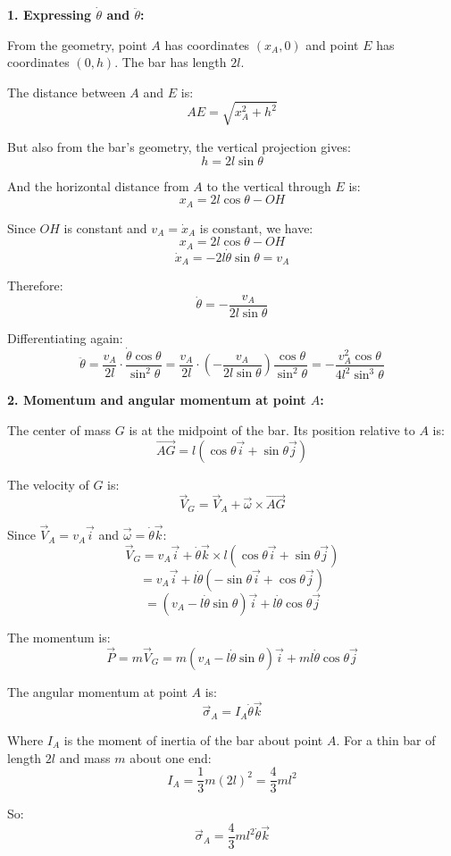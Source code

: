 \documentclass[12pt]{article}
\begin{document}
\begin{correctionbox}
\textbf{1. Expressing $\dot{\theta}$ and $\ddot{\theta}$:}

From the geometry, point $A$ has coordinates $(x_A, 0)$ and point $E$ has coordinates $(0, h)$. The bar has length $2l$.

The distance between $A$ and $E$ is:
$$AE = \sqrt{x_A^2 + h^2}$$

But also from the bar's geometry, the vertical projection gives:
$$h = 2l\sin\theta$$

And the horizontal distance from $A$ to the vertical through $E$ is:
$$x_A = 2l\cos\theta - OH$$

Since $OH$ is constant and $v_A = \dot{x}_A$ is constant, we have:
$$x_A = 2l\cos\theta - OH$$
$$\dot{x}_A = -2l\dot{\theta}\sin\theta = v_A$$

Therefore:
$$\dot{\theta} = -\frac{v_A}{2l\sin\theta}$$

Differentiating again:
$$\ddot{\theta} = \frac{v_A}{2l}\cdot\frac{\dot{\theta}\cos\theta}{\sin^2\theta} = \frac{v_A}{2l}\cdot\left(-\frac{v_A}{2l\sin\theta}\right)\frac{\cos\theta}{\sin^2\theta} = -\frac{v_A^2\cos\theta}{4l^2\sin^3\theta}$$

\textbf{2. Momentum and angular momentum at point $A$:}

The center of mass $G$ is at the midpoint of the bar. Its position relative to $A$ is:
$$\vec{AG} = l(\cos\theta\vec{i} + \sin\theta\vec{j})$$

The velocity of $G$ is:
$$\vec{V}_G = \vec{V}_A + \vec{\omega} \times \vec{AG}$$

Since $\vec{V}_A = v_A\vec{i}$ and $\vec{\omega} = \dot{\theta}\vec{k}$:
$$\vec{V}_G = v_A\vec{i} + \dot{\theta}\vec{k} \times l(\cos\theta\vec{i} + \sin\theta\vec{j})$$
$$= v_A\vec{i} + l\dot{\theta}(-\sin\theta\vec{i} + \cos\theta\vec{j})$$
$$= (v_A - l\dot{\theta}\sin\theta)\vec{i} + l\dot{\theta}\cos\theta\vec{j}$$

The momentum is:
$$\vec{P} = m\vec{V}_G = m(v_A - l\dot{\theta}\sin\theta)\vec{i} + ml\dot{\theta}\cos\theta\vec{j}$$

The angular momentum at point $A$ is:
$$\vec{\sigma}_A = I_A\dot{\theta}\vec{k}$$

Where $I_A$ is the moment of inertia of the bar about point $A$. For a thin bar of length $2l$ and mass $m$ about one end:
$$I_A = \frac{1}{3}m(2l)^2 = \frac{4}{3}ml^2$$

So:
$$\vec{\sigma}_A = \frac{4}{3}ml^2\dot{\theta}\vec{k}$$


\end{correctionbox}
\end{document}
